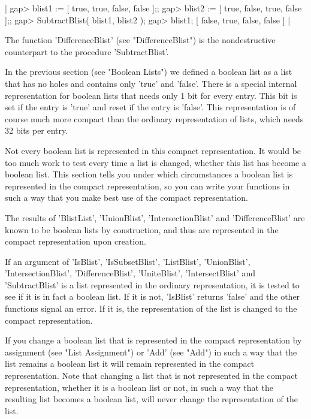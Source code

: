 |    gap> blist1 := [ true, true, false, false ];;
    gap> blist2 := [ true, false, true, false ];;
    gap> SubtractBlist( blist1, blist2 );
    gap> blist1;
    [ false, true, false, false ] |

The function   'DifferenceBlist'    (see   "DifferenceBlist")    is   the
nondestructive counterpart to the procedure 'SubtractBlist'.


In  the previous section (see "Boolean  Lists") we defined a boolean list
as a list that has no holes and contains  only 'true' and 'false'.  There
is a special internal representation for boolean lists  that needs only 1
bit for every entry.  This bit is set if the entry is 'true' and reset if
the entry is 'false'.  This representation is of course much more compact
than the ordinary representation of lists, which needs 32 bits per entry.

Not every boolean list is represented in this compact representation.  It
would be too much work to test every time a list is changed, whether this
list has become  a boolean  list.   This section  tells  you under  which
circumstances  a      boolean  list  is  represented    in   the  compact
representation, so  you can write  your functions in  such a way that you
make best use of the compact representation.

The   results  of  'BlistList',   'UnionBlist',   'IntersectionBlist' and
'DifferenceBlist' are known to be boolean lists by construction, and thus
are represented in the compact representation upon creation.

If  an argument of 'IsBlist', 'IsSubsetBlist', 'ListBlist', 'UnionBlist',
'IntersectionBlist',  'DifferenceBlist',   'UniteBlist', 'IntersectBlist'
and 'SubtractBlist' is a list represented in the ordinary representation,
it  is tested to  see if  it is in  fact a boolean list.  If  it is  not,
'IsBlist' returns 'false' and the other functions signal an error.  If it
is,   the   representation of  the  list    is  changed  to   the compact
representation.

If  you change  a   boolean list that  is    represented in   the compact
representation by assignment (see "List Assignment") or 'Add' (see "Add")
in  such a way  that  the  list  remains a  boolean list   it will remain
represented  in the compact  representation.   Note  that changing a list
that is not represented in the compact  representation,  whether it  is a
boolean list or not,  in  such a way that  the  resulting list becomes  a
boolean list, will never change the representation of the list.

